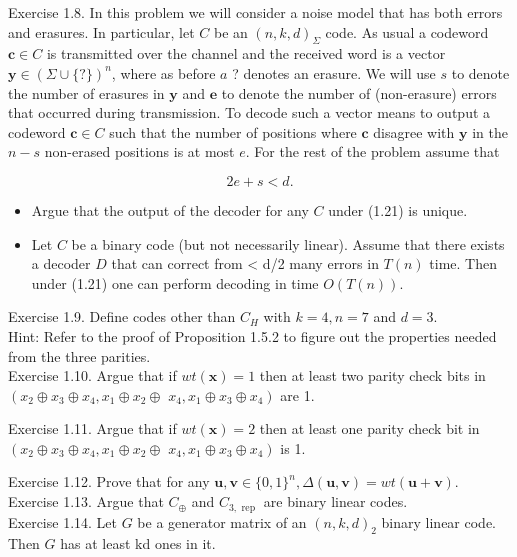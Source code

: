 \documentclass[10pt]{article}
\begin{document}
Exercise 1.8. In this problem we will consider a noise model that has both errors and erasures. In particular, let $C$ be an $(n, k, d)_{\Sigma}$ code. As usual a codeword $\mathbf{c} \in C$ is transmitted over the channel and the received word is a vector $\mathbf{y} \in(\Sigma \cup\{?\})^{n}$, where as before $a$ ? denotes an erasure. We will use $s$ to denote the number of erasures in $\mathbf{y}$ and $\boldsymbol{e}$ to denote the number of (non-erasure) errors that occurred during transmission. To decode such a vector means to output a codeword $\mathbf{c} \in C$ such that the number of positions where $\mathbf{c}$ disagree with $\mathbf{y}$ in the $n-s$ non-erased positions is at most $e$. For the rest of the problem assume that


\begin{equation*}
2 e+s<d . \tag{1.21}
\end{equation*}


\begin{itemize}
  \item[1.] Argue that the output of the decoder for any $C$ under (1.21) is unique.
  \item[2.] Let $C$ be a binary code (but not necessarily linear). Assume that there exists a decoder $D$ that can correct from < d/2 many errors in $T(n)$ time. Then under (1.21) one can perform decoding in time $O(T(n))$.
\end{itemize}

Exercise 1.9. Define codes other than $C_{H}$ with $k=4, n=7$ and $d=3$.\\
Hint: Refer to the proof of Proposition 1.5.2 to figure out the properties needed from the three parities.\\
Exercise 1.10. Argue that if $w t(\mathbf{x})=1$ then at least two parity check bits in $\left(x_{2} \oplus x_{3} \oplus x_{4}, x_{1} \oplus x_{2} \oplus\right.$ $\left.x_{4}, x_{1} \oplus x_{3} \oplus x_{4}\right)$ are 1.

Exercise 1.11. Argue that if $w t(\mathbf{x})=2$ then at least one parity check bit in $\left(x_{2} \oplus x_{3} \oplus x_{4}, x_{1} \oplus x_{2} \oplus\right.$ $\left.x_{4}, x_{1} \oplus x_{3} \oplus x_{4}\right)$ is 1.

Exercise 1.12. Prove that for any $\mathbf{u}, \mathbf{v} \in\{0,1\}^{n}, \Delta(\mathbf{u}, \mathbf{v})=w t(\mathbf{u}+\mathbf{v})$.\\
Exercise 1.13. Argue that $C_{\oplus}$ and $C_{3, \text { rep }}$ are binary linear codes.\\
Exercise 1.14. Let $G$ be a generator matrix of an $(n, k, d)_{2}$ binary linear code. Then $G$ has at least kd ones in it.
\end{document}
